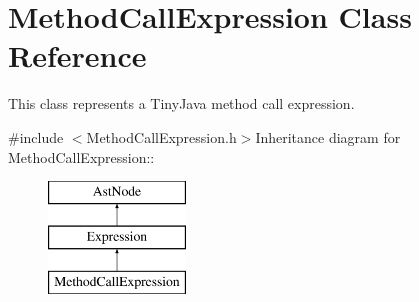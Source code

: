 \hypertarget{classMethodCallExpression}{
\section{MethodCallExpression Class Reference}
\label{classMethodCallExpression}
}


This class represents a TinyJava method call expression.  


{\ttfamily \#include $<$MethodCallExpression.h$>$}Inheritance diagram for MethodCallExpression::\begin{figure}[H]
\begin{center}
\leavevmode
\includegraphics[height=3cm]{classMethodCallExpression}
\end{center}
\end{figure}
